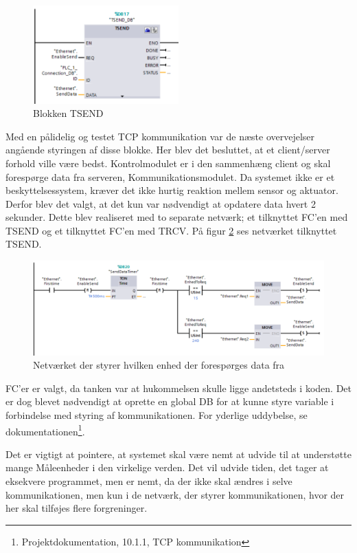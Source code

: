 \begin{figure}[H] %
	\centering
	\includegraphics[width=0.5\textwidth]{Figure/TSEND}
	\caption{Blokken TSEND}
	\label{fig:TSEND}
\end{figure}


Med en pålidelig og testet TCP kommunikation var de næste overvejelser angående styringen af disse blokke. Her blev det besluttet, at et client/server forhold ville være bedst. Kontrolmodulet er i den sammenhæng client og skal forespørge data fra serveren, Kommunikationsmodulet.
Da systemet ikke er et beskyttelsessystem, kræver det ikke hurtig reaktion mellem sensor og aktuator. Derfor blev det valgt, at det kun var nødvendigt at opdatere data hvert 2 sekunder. Dette blev realiseret med to separate netværk; et tilknyttet FC'en med TSEND og et tilknyttet FC'en med TRCV. På figur \ref{fig:ValgAfEnhedSend} ses netværket tilknyttet TSEND.

\begin{figure}[H] %
	\centering
	\includegraphics[width=1\textwidth]{Figure/valgAfEnhedSend}
	\caption{Netværket der styrer hvilken enhed der forespørges data fra}
	\label{fig:ValgAfEnhedSend}
\end{figure}

FC'er er valgt, da tanken var at hukommelsen skulle ligge andetsteds i koden. Det er dog blevet nødvendigt at oprette en global DB for at kunne styre variable i forbindelse med styring af kommunikationen. For yderlige uddybelse, se dokumentationen\footnote{Projektdokumentation, 10.1.1, TCP kommunikation}.


Det er vigtigt at pointere, at systemet skal være nemt at udvide til at understøtte mange Måleenheder i den virkelige verden. Det vil udvide tiden, det tager at eksekvere programmet, men er nemt, da der ikke skal ændres i selve kommunikationen, men kun i de netværk, der styrer kommunikationen, hvor der her skal tilføjes flere forgreninger.

